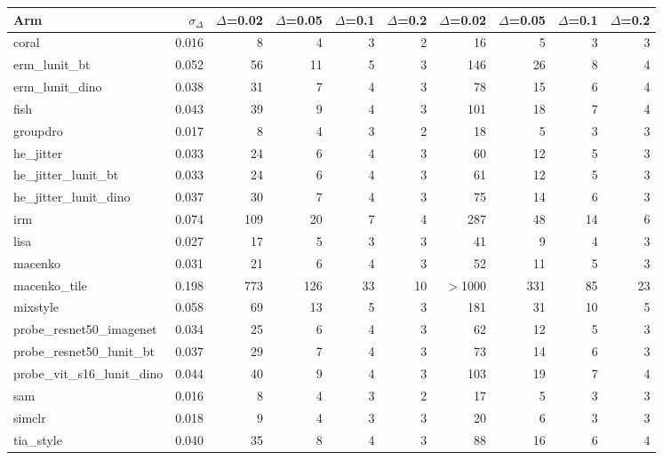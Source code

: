\begin{tabular}{lrrrrrrrrr}
\toprule
Arm & $\sigma_\Delta$ & $\Delta$=0.02 & $\Delta$=0.05 & $\Delta$=0.1 & $\Delta$=0.2 & $\Delta$=0.02 & $\Delta$=0.05 & $\Delta$=0.1 & $\Delta$=0.2 \\
\midrule
coral & 0.016 & 8 & 4 & 3 & 2 & 16 & 5 & 3 & 3 \\
erm\_lunit\_bt & 0.052 & 56 & 11 & 5 & 3 & 146 & 26 & 8 & 4 \\
erm\_lunit\_dino & 0.038 & 31 & 7 & 4 & 3 & 78 & 15 & 6 & 4 \\
fish & 0.043 & 39 & 9 & 4 & 3 & 101 & 18 & 7 & 4 \\
groupdro & 0.017 & 8 & 4 & 3 & 2 & 18 & 5 & 3 & 3 \\
he\_jitter & 0.033 & 24 & 6 & 4 & 3 & 60 & 12 & 5 & 3 \\
he\_jitter\_lunit\_bt & 0.033 & 24 & 6 & 4 & 3 & 61 & 12 & 5 & 3 \\
he\_jitter\_lunit\_dino & 0.037 & 30 & 7 & 4 & 3 & 75 & 14 & 6 & 3 \\
irm & 0.074 & 109 & 20 & 7 & 4 & 287 & 48 & 14 & 6 \\
lisa & 0.027 & 17 & 5 & 3 & 3 & 41 & 9 & 4 & 3 \\
macenko & 0.031 & 21 & 6 & 4 & 3 & 52 & 11 & 5 & 3 \\
macenko\_tile & 0.198 & 773 & 126 & 33 & 10 & $>$1000 & 331 & 85 & 23 \\
mixstyle & 0.058 & 69 & 13 & 5 & 3 & 181 & 31 & 10 & 5 \\
probe\_resnet50\_imagenet & 0.034 & 25 & 6 & 4 & 3 & 62 & 12 & 5 & 3 \\
probe\_resnet50\_lunit\_bt & 0.037 & 29 & 7 & 4 & 3 & 73 & 14 & 6 & 3 \\
probe\_vit\_s16\_lunit\_dino & 0.044 & 40 & 9 & 4 & 3 & 103 & 19 & 7 & 4 \\
sam & 0.016 & 8 & 4 & 3 & 2 & 17 & 5 & 3 & 3 \\
simclr & 0.018 & 9 & 4 & 3 & 3 & 20 & 6 & 3 & 3 \\
tia\_style & 0.040 & 35 & 8 & 4 & 3 & 88 & 16 & 6 & 4 \\
\bottomrule
\end{tabular}
